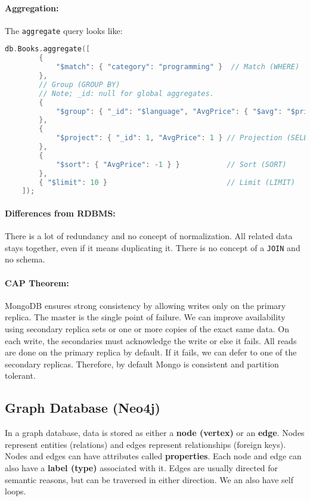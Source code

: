 \documentclass{report}
\renewcommand{\bf}[1]{\textbf{{#1}}}
\renewcommand{\tt}[1]{\texttt{{#1}}}
\begin{document}
\paragraph{Aggregation:} The \tt{aggregate} query looks like:
\begin{lstlisting}[language=C++, style=colorEX]
    db.Books.aggregate([
        {
            "$match": { "category": "programming" }  // Match (WHERE)
        },
        // Group (GROUP BY)
        // Note; _id: null for global aggregates.
        {
            "$group": { "_id": "$language", "AvgPrice": { "$avg": "$price" } }
        },
        {
            "$project": { "_id": 1, "AvgPrice": 1 } // Projection (SELECT)
        },
        {
            "$sort": { "AvgPrice": -1 } }           // Sort (SORT)
        },
        { "$limit": 10 }                            // Limit (LIMIT)
    ]);
\end{lstlisting}

\paragraph{Differences from RDBMS:} There is a lot of redundancy and no concept
of normalization. All related data stays together, even if it means duplicating
it. There is no concept of a \tt{JOIN} and no schema.

\paragraph{CAP Theorem:} MongoDB ensures strong consistency by allowing writes
only on the primary replica. The master is the single point of failure. We can
improve availability using secondary replica sets or one or more copies of the
exact same data. On each write, the secondaries must acknowledge the write or
else it fails. All reads are done on the primary replica by default. If it
fails, we can defer to one of the secondary replicas. Therefore, by default
Mongo is consistent and partition tolerant.


\subsection{Graph Database (Neo4j)}
In a graph database, data is stored as either a \bf{node (vertex)} or an
\bf{edge}. Nodes represent entities (relations) and edges represent
relationships (foreign keys). Nodes and edges can have attributes called
\bf{properties}. Each node and edge can also have a \bf{label (type)} associated
with it. Edges are usually directed for semantic reasons, but can be traversed
in either direction. We an also have self loops.
\end{document}
